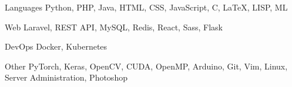 

\begin{cvskills}

  \cvskill
    {Languages} %
    {Python, PHP, Java, HTML, CSS, JavaScript, C, \LaTeX, LISP, ML} %

  \cvskill
    {Web} %
    {Laravel, REST API, MySQL, Redis, React, Sass, Flask} %

  \cvskill
    {DevOps} %
    {Docker, Kubernetes} %

  \cvskill
    {Other} %
    {PyTorch, Keras, OpenCV, CUDA, OpenMP, Arduino, Git, Vim, Linux, Server Administration, Photoshop} %

\end{cvskills}
